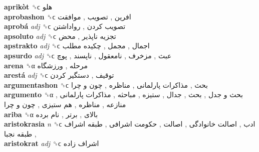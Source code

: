 \textbf{aprikòt} ␝ϲ   هلو   \\
\textbf{aprobashon} ␝ϲ   افرین ,  تصویب ,  موافقت   \\
\textbf{aprobá} \emph{adj}  ␝ϲ   تصویب کردن ,  رواداشتن   \\
\textbf{apsoluto} \emph{adj}  ␝ϲ   تجزیه ناپذیر ,  محض   \\
\textbf{apstrakto} \emph{adj}  ␝ϲ   اجمال ,  مجمل ,  چکیده مطلب   \\
\textbf{apsurdo} \emph{adj}  ␝ϲ   عبث ,  مزخرف ,  نامعقول ,  ناپسند ,  پوچ   \\
\textbf{arena} ␝α   مرحله ,  ورزشگاه   \\
\textbf{arestá} \emph{adj}  ␝ϲ   توقیف ,  دستگیر کردن   \\
\textbf{argumentashon} ␝ϲ   بحث ,  مذاکرات پارلمانی ,  مناظره ,  چون و چرا   \\
\textbf{argumento} ␝α   بحث و جدل ,  بحث ,  جدال ,  ستیزه ,  مباحثه ,  مذاکرات پارلمانی ,  منازعه ,  مناظره ,  هم ستیزی ,  چون و چرا   \\
\textbf{ariba} ␝α   بالای ,  برتر ,  نام برده   \\
\textbf{aristokrasia} \emph{n}  ␝ϲ   ادب ,  اصالت خانوادگی ,  اصالت ,  حکومت اشرافی ,  طبقه اشراف ,  طبقه نجبا   \\
\textbf{aristokrat} \emph{adj}  ␝ϲ   اشراف زاده   \\
